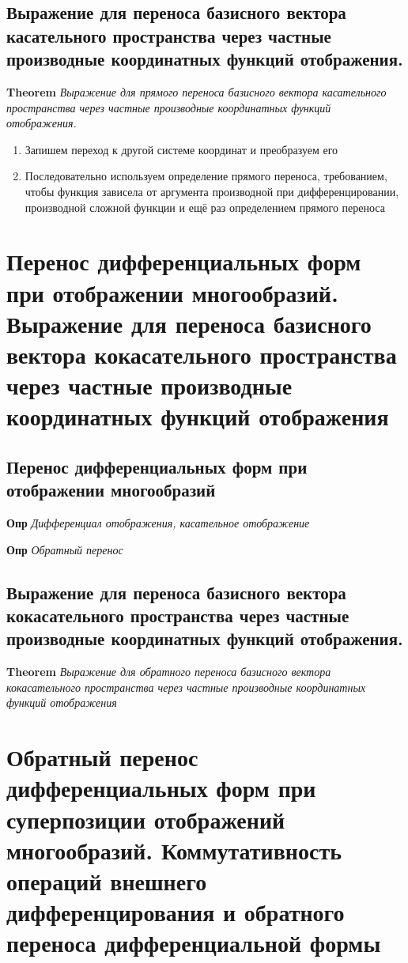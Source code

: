\documentclass[a4paper, 14pt]{article}
\begin{document}
    \subsection{Выражение для переноса базисного вектора касательного пространства через частные производные
    координатных функций отображения.}
    
    \textbf{Theorem} \textit{Выражение для прямого переноса базисного вектора касательного пространства через частные
    производные координатных функций отображения.}
    
    \begin{enumerate}
        \item Запишем переход к другой системе координат и преобразуем его
        \item Последовательно используем определение прямого переноса, требованием, чтобы функция зависела от
        аргумента производной при дифференцировании, производной сложной функции и ещё раз определением прямого переноса
    \end{enumerate}
    
    \section{Перенос дифференциальных форм при отображении многообразий.
    Выражение для переноса базисного вектора кокасательного пространства через частные производные координатных
    функций отображения}
    
    \subsection{Перенос дифференциальных форм при отображении многообразий}
    
    \textbf{Опр} \textit{Дифференциал отображения, касательное отображение}
    
    \textbf{Опр} \textit{Обратный перенос}
    
    \subsection{Выражение для переноса базисного вектора кокасательного пространства через частные производные
    координатных функций отображения.}
    
    \textbf{Theorem} \textit{Выражение для обратного переноса базисного вектора кокасательного пространства через частные
    производные координатных функций отображения}
    
    \section{Обратный перенос дифференциальных форм при суперпозиции отображений многообразий.
    Коммутативность операций внешнего дифференцирования и обратного переноса дифференциальной формы}
    
\end{document}
